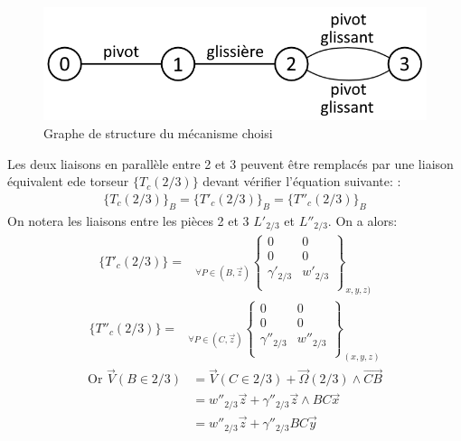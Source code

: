 \documentclass[12pt,a4paper]{report}
\begin{document}
\begin{figure}[!h]
 \center
 \includegraphics[scale=0.6]{../pictures/graphe_structure.png}
 \caption{Graphe de structure du mécanisme choisi}
\end{figure}

	Les deux liaisons en parallèle entre 2 et 3 peuvent être remplacés par une liaison équivalent ede torseur $\{ T_c (2/3) \}$ devant vérifier l'équation suivante: : 
	\begin{align*}
\{ T_c (2/3) \}_{B} = \{ T'_c (2/3) \}_{B} = \{ T''_c (2/3) \}_{B}
\end{align*}
On notera les liaisons entre les pièces 2 et 3 $L'_{2/3}$ et $L''_{2/3}$. On a alors:
\begin{align*}
\{ T'_c (2/3) \} =
\begin{array}{c}
	\\ \\ \\ 
\end{array} _{\forall P \in (B,\overrightarrow{z})}
\left\{
\begin{array}{cc}
	0 & 0 \\
	0 & 0 \\
	\gamma'_{2/3} & w'_{2/3} \\
\end{array}
\right\} _{x,y,z)}
\end{align*} 
\begin{align*}
\{ T''_c (2/3) \} = 
\begin{array}{c}
	\\ \\ \\ 
\end{array} _{\forall P \in (C, \overrightarrow{z})}
\left\{
\begin{array}{cc}
	0 & 0 \\
	0 & 0 \\
	\gamma''_{2/3} & w''_{2/3} \\
\end{array}
\right\} _{(x, y, z)}
\end{align*}
\begin{align*}
\mbox{Or } \overrightarrow{V}(B \in 2/3) 
&= \overrightarrow{V}(C \in 2/3)+\overrightarrow{\Omega}(2/3) \wedge \overrightarrow{CB}\\ 
&= w''_{2/3} \overrightarrow{z} + \gamma''_{2/3} \overrightarrow{z} \wedge BC \overrightarrow{x} \\
&= w''_{2/3} \overrightarrow{z} + \gamma''_{2/3}BC \overrightarrow{y}
\end{align*} 
\end{document}
